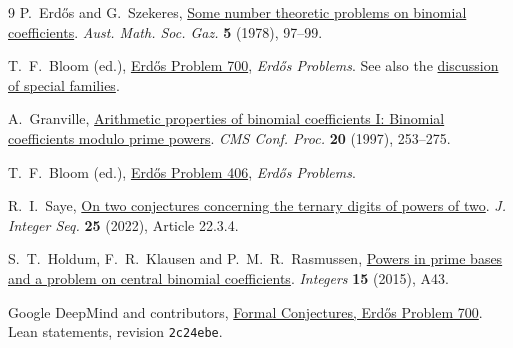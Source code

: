 \documentclass[a4paper,11pt]{article}
\begin{document}
\begin{thebibliography}{9}
P.~Erd\H{o}s and G.~Szekeres,
\href{https://static.renyi.hu/~p_erdos/1978-46.pdf}{Some number theoretic problems on binomial coefficients}.
\emph{Aust. Math. Soc. Gaz.} \textbf{5} (1978), 97--99.

T.~F.~Bloom (ed.), \href{https://www.erdosproblems.com/700}{Erd\H{o}s Problem 700},
\emph{Erd\H{o}s Problems}. See also the
\href{https://www.erdosproblems.com/forum/thread/700?order=oldest}{discussion of special families}.

A.~Granville,
\href{https://www.cecm.sfu.ca/organics/papers/granville/}{Arithmetic properties of binomial coefficients I: Binomial coefficients modulo prime powers}.
\emph{CMS Conf. Proc.} \textbf{20} (1997), 253--275.

T.~F.~Bloom (ed.), \href{https://www.erdosproblems.com/406}{Erd\H{o}s Problem 406},
\emph{Erd\H{o}s Problems}.

R.~I.~Saye,
\href{https://cs.uwaterloo.ca/journals/JIS/VOL25/Saye/saye3.html}{On two conjectures concerning the ternary digits of powers of two}.
\emph{J. Integer Seq.} \textbf{25} (2022), Article 22.3.4.

S.~T.~Holdum, F.~R.~Klausen and P.~M.~R.~Rasmussen,
\href{https://math.colgate.edu/~integers/p43/p43.pdf}{Powers in prime bases and a problem on central binomial coefficients}.
\emph{Integers} \textbf{15} (2015), A43.

Google DeepMind and contributors,
\href{https://github.com/google-deepmind/formal-conjectures/blob/2c24ebe7eb2a79b47f9ffcab618cd611c2bc1ea6/FormalConjectures/ErdosProblems/700.lean}{Formal Conjectures, Erd\H{o}s Problem 700}.
Lean statements, revision \texttt{2c24ebe}.
\end{thebibliography}
\end{document}
